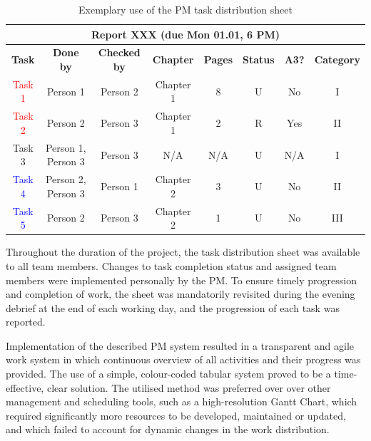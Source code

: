 \begin{table}[H]
\centering
\caption{Exemplary use of the PM task distribution sheet}
\begin{tabular}{|c|c|c|c|c|c|c|c|}
\hline


\multicolumn{8}{|c|}{\textbf{Report XXX (due Mon 01.01, 6 PM)}} \\\hline
\textbf{Task} & \textbf{Done by} & \textbf{Checked by} &
\textbf{Chapter} & \textbf{Pages} & \textbf{Status} &
\textbf{A3?} & \textbf{Category} \\
\hline


\textcolor{red}{Task 1} & Person 1 & Person 2 & Chapter 1 & 8 & \cellcolor{green!50}U & No & I \\\hline
\textcolor{red}{Task 2} & Person 2 & Person 3 & Chapter 1 & 2 & \cellcolor{green!50} R & Yes & II \\\hline
Task 3 & Person 1, Person 3 & Person 3 & N/A & N/A & \cellcolor{yellow!50}U & N/A & I \\\hline
\textcolor{blue}{Task 4} & Person 2, Person 3 & Person 1 & Chapter 2 & 3 & \cellcolor{orange!50}U & No & II \\\hline
\textcolor{blue}{Task 5} & Person 2 & Person 3 & Chapter 2 & 1 & \cellcolor{red!50}U & No & III \\\hline

\end{tabular}

\label{tab:pm_task_distribution}
\end{table}

Throughout the duration of the project, the task distribution sheet was available to all team members. Changes to task completion status and assigned team members were implemented personally by the PM. To ensure timely progression and completion of work, the sheet was mandatorily revisited during the evening debrief at the end of each working day, and the progression of each task was reported.


Implementation of the described PM system resulted in a transparent and agile work system in which continuous overview of all activities and their progress was provided. The use of a simple, colour-coded tabular system proved to be a time-effective, clear solution. The utilised method was preferred over over other management and scheduling tools, such as a high-resolution Gantt Chart, which required significantly more resources to be developed, maintained or updated, and which failed to account for dynamic changes in the work distribution.

